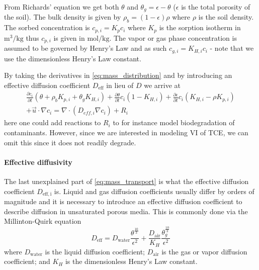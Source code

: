 From Richards' equation we get both $\theta$ and $\theta_g = \epsilon - \theta$ ($\epsilon$ is the total porosity of the soil).
The bulk density is given by $\rho_b = (1-\epsilon) \rho$ where $\rho$ is the soil density.
The sorbed concentration is $c_{p,i} = K_p c_i$ where $K_p$ is the sorption isotherm in $\mathrm{m^3/kg}$ thus $c_{p,i}$ is given in $\mathrm{mol/kg}$.
The vapor or gas phase concentration is assumed to be governed by Henry's Law and as such $c_{g,i} = K_{H,i} c_i$ - note that we use the dimensionless Henry's Law constant.\par

By taking the derivatives in \eqref{eq:mass_distribution} and by introducing an effective diffusion coefficient $D_\mathrm{eff}$ in lieu of $D$ we arrive at
\begin{equation}\label{eq:mass_transport}
  \begin{split}
    \frac{\partial c_i}{\partial t} (\theta + \rho_b K_{p,i} + \theta_g K_{H,i}) +
    \frac{\partial \theta}{\partial t} c_i (1-K_{H,i}) +
    \frac{\partial \epsilon}{\partial t} c_i (K_{H,i} - \rho K_{p,i}) \\ +
    \vec{u} \cdot \nabla c_i =
    \nabla \cdot (D_{eff,i} \nabla c_i) +
    R_i
  \end{split}
\end{equation}
here one could add reactions to $R_i$ to for instance model biodegradation of contaminants.
However, since we are interested in modeling VI of TCE, we can omit this since it does not readily degrade.\par

\paragraph{Effective diffusivity}

The last unexplained part of \eqref{eq:mass_transport} is what the effective diffusion coefficient $D_\mathrm{eff,i}$ is.
Liquid and gas diffusion coefficients usually differ by orders of magnitude and it is necessary to introduce an effective diffusion coefficient to describe diffusion in unsaturated porous media.
This is commonly done via the Millinton-Quirk equation\cite{millington_permeability_1961}
\begin{equation}\label{eq:millington_quirk}
  D_\mathrm{eff} = D_\mathrm{water} \frac{\theta^{\frac{10}{3}}}{\epsilon^2} + \frac{D_\mathrm{air}}{K_H} \frac{\theta_g^{\frac{10}{3}}}{\epsilon^2}
\end{equation}
where $D_\mathrm{water}$ is the liquid diffusion coefficient; $D_\mathrm{air}$ is the gas or vapor diffusion coefficient; and $K_H$ is the dimensionless Henry's Law constant.\par

